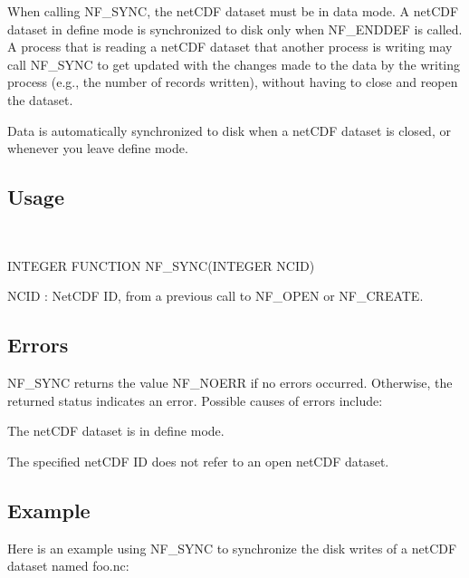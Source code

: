 When calling N\+F\+\_\+\+S\+Y\+NC, the net\+C\+DF dataset must be in data mode. A net\+C\+DF dataset in define mode is synchronized to disk only when N\+F\+\_\+\+E\+N\+D\+D\+EF is called. A process that is reading a net\+C\+DF dataset that another process is writing may call N\+F\+\_\+\+S\+Y\+NC to get updated with the changes made to the data by the writing process (e.\+g., the number of records written), without having to close and reopen the dataset.

Data is automatically synchronized to disk when a net\+C\+DF dataset is closed, or whenever you leave define mode.

\subsection*{Usage }

 

I\+N\+T\+E\+G\+ER F\+U\+N\+C\+T\+I\+ON N\+F\+\_\+\+S\+Y\+N\+C(\+I\+N\+T\+E\+G\+E\+R N\+C\+I\+D)

{\ttfamily N\+C\+ID} \+: Net\+C\+DF ID, from a previous call to N\+F\+\_\+\+O\+P\+EN or N\+F\+\_\+\+C\+R\+E\+A\+TE.

\subsection*{Errors }

N\+F\+\_\+\+S\+Y\+NC returns the value N\+F\+\_\+\+N\+O\+E\+RR if no errors occurred. Otherwise, the returned status indicates an error. Possible causes of errors include\+:


\begin{DoxyItemize}
\item The net\+C\+DF dataset is in define mode.
\item The specified net\+C\+DF ID does not refer to an open net\+C\+DF dataset.
\end{DoxyItemize}

\subsection*{Example }

Here is an example using N\+F\+\_\+\+S\+Y\+NC to synchronize the disk writes of a net\+C\+DF dataset named foo.\+nc\+:

 

